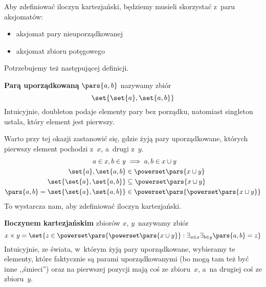 Aby zdefiniować iloczyn kartezjański, będziemy musieli skorzystać z~paru aksjomatów:
\begin{itemize}
    \item aksjomat pary nieuporządkowanej
    \item aksjomat zbioru potęgowego
\end{itemize}
Potrzebujemy też następującej definicji.
\begin{definition}
\label{mfi:cartesian_and_relations:cartesian_definitions:def:ordered_pair}
\textbf{Parą uporządkowaną} \(\pars{a, b}\) nazywamy zbiór
\begin{equation*}
    \set{\set{a}, \set{a, b}}
\end{equation*}
Intuicyjnie, doubleton podaje elementy pary bez porządku, natomiast singleton ustala, który element jest pierwszy.
\end{definition}
Warto przy tej okazji zastanowić się, gdzie żyją pary uporządkowane, których pierwszy element pochodzi z~\(x\), a~drugi z~\(y\).
\begin{align*}
    a \in x, b \in y &\implies a, b \in x \cup y\\
    \set{a}, \set{a, b} &\in \powerset\pars{x \cup y}\\
    \set{\set{a}, \set{a, b}} &\subseteq \powerset\pars{x \cup y}\\
    \pars{a, b} = \set{\set{a}, \set{a, b}} &\in \powerset\pars{\powerset\pars{x \cup y}}
\end{align*}
To wystarcza nam, aby zdefiniować iloczyn kartezjański.
\begin{definition}
\textbf{Iloczynem kartezjańskim} zbiorów \(x\), \(y\)~nazywamy zbiór
\begin{equation*}
    x \times y = \set{z \in \powerset\pars{\powerset\pars{x \cup y}} : \exists_{a \in x}\exists_{b \in y} \pars{a, b} = z}
\end{equation*}
Intuicyjnie, ze świata, w~którym żyją pary uporządkowane, wybieramy te elementy, które faktycznie są parami uporządkowanymi (bo mogą tam też być inne ,,śmieci'') oraz na pierwszej pozycji mają coś ze zbioru~\(x\), a~na drugiej coś ze zbioru~\(y\).
\end{definition}
